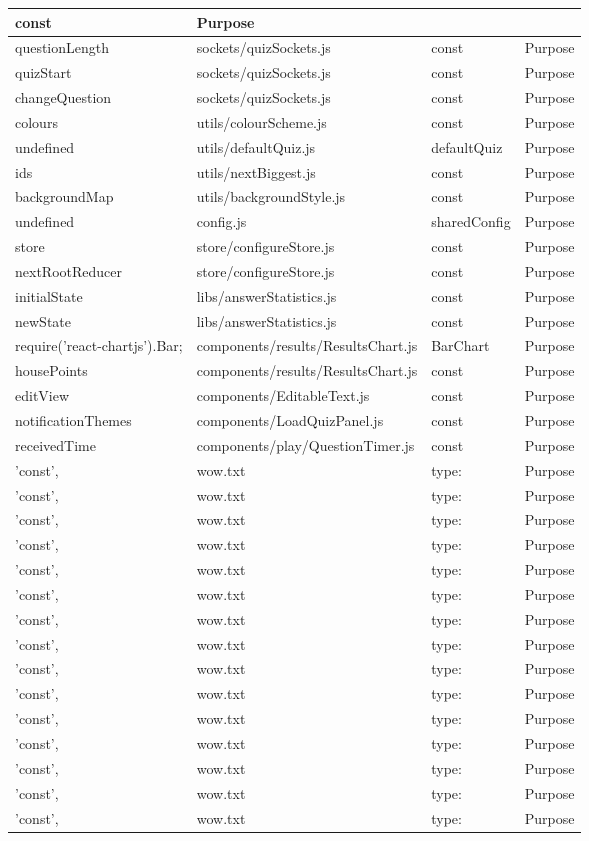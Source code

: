 \begin{table}[]
\begin{tabular}{|l|l|l|l|}
const & Purpose \\ \hline questionLength & sockets/quizSockets.js & const & Purpose \\ \hline quizStart & sockets/quizSockets.js & const & Purpose \\ \hline changeQuestion & sockets/quizSockets.js & const & Purpose \\ \hline colours & utils/colourScheme.js & const & Purpose \\ \hline undefined & utils/defaultQuiz.js & defaultQuiz & Purpose \\ \hline ids & utils/nextBiggest.js & const & Purpose \\ \hline backgroundMap & utils/backgroundStyle.js & const & Purpose \\ \hline undefined & config.js & sharedConfig & Purpose \\ \hline store & store/configureStore.js & const & Purpose \\ \hline nextRootReducer & store/configureStore.js & const & Purpose \\ \hline initialState & libs/answerStatistics.js & const & Purpose \\ \hline newState & libs/answerStatistics.js & const & Purpose \\ \hline require('react-chartjs').Bar; & components/results/ResultsChart.js & BarChart & Purpose \\ \hline housePoints & components/results/ResultsChart.js & const & Purpose \\ \hline editView & components/EditableText.js & const & Purpose \\ \hline notificationThemes & components/LoadQuizPanel.js & const & Purpose \\ \hline receivedTime & components/play/QuestionTimer.js & const & Purpose \\ \hline 'const', & wow.txt & type: & Purpose \\ \hline 'const', & wow.txt & type: & Purpose \\ \hline 'const', & wow.txt & type: & Purpose \\ \hline 'const', & wow.txt & type: & Purpose \\ \hline 'const', & wow.txt & type: & Purpose \\ \hline 'const', & wow.txt & type: & Purpose \\ \hline 'const', & wow.txt & type: & Purpose \\ \hline 'const', & wow.txt & type: & Purpose \\ \hline 'const', & wow.txt & type: & Purpose \\ \hline 'const', & wow.txt & type: & Purpose \\ \hline 'const', & wow.txt & type: & Purpose \\ \hline 'const', & wow.txt & type: & Purpose \\ \hline 'const', & wow.txt & type: & Purpose \\ \hline 'const', & wow.txt & type: & Purpose \\ \hline 'const', & wow.txt & type: & Purpose \\ 
\end{tabular}
\end{table}
